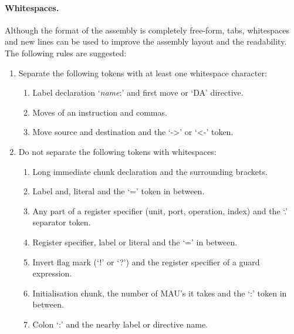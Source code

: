 \documentclass[a4paper,twoside]{tceusermanual}
\begin{document}
\paragraph{Whitespaces.}
Although the format of the assembly is completely free-form, tabs,
whitespaces and new lines can be used to improve the assembly layout and the
readability. The following rules are suggested:
\begin{enumerate}
\item %
  Separate the following tokens with at least one whitespace character:
  \begin{enumerate}
  \item %
    Label declaration `\emph{name}:' and first move or `DA' directive.
  \item %
    Moves of an instruction and commas.
  \item %
    Move source and destination and the `->' or `<-' token.
  \end{enumerate}
\item %
  Do not separate the following tokens with whitespaces:
  \begin{enumerate}
  \item %
    Long immediate chunk declaration and the surrounding brackets.
  \item %
    Label and, literal and the `=' token in between.
  \item %
    Any part of a register specifier (unit, port, operation, index) and the
    `.' separator token.
  \item %
    Register specifier, label or literal and the `=' in between.
  \item %
    Invert flag mark (`!' or `?') and the register specifier of a guard
    expression.
  \item %
    Initialisation chunk, the number of MAU's it takes and the `:' token in
    between.
  \item %
    Colon `:' and the nearby label or directive name.
  \end{enumerate}
\end{enumerate}
\end{document}
